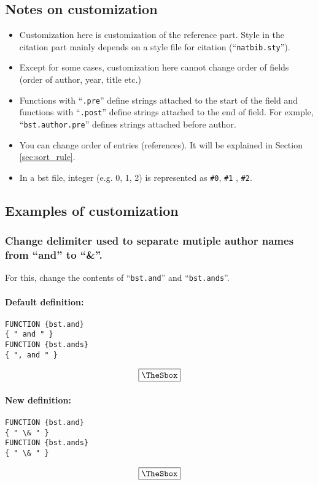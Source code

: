 \documentclass[10pt]{article}
\newenvironment{Frame}%
{\setlength{\fboxsep}{15pt}
\setlength{\mylength}{\linewidth}%
\addtolength{\mylength}{-2\fboxsep}%
\addtolength{\mylength}{-2\fboxrule}%
\Sbox
\minipage{\mylength}%
\setlength{\abovedisplayskip}{0pt}%
\setlength{\belowdisplayskip}{0pt}%
}%
{\endminipage\endSbox
\[\fbox{\TheSbox}\]}
\begin{document}
\subsection{Notes on customization}

\begin{itemize}
 \item Customization here is customization of the reference part.  Style
       in the citation part mainly depends on a style file for citation
       (``\texttt{natbib.sty}'').
 \item Except for some cases, customization here cannot change order
       of fields (order of author, year, title etc.)
 \item Functions with ``\texttt{.pre}'' define strings attached to the start
       of the field and functions with ``\texttt{.post}'' define strings
       attached to the end of field.  For exmple,
       ``\texttt{bst.author.pre}'' defines strings attached before author.
 \item You can change order of entries (references).  It will be
       explained in Section \ref{sec:sort_rule}.
 \item In a bst file, integer (e.g. 0, 1, 2) is represented as \verb|#0|, \verb|#1| , \verb|#2|.
\end{itemize}

\subsection{Examples of customization}

\subsubsection{Change delimiter used to separate mutiple author names
   from ``and'' to ``\&''.}

For this, change the contents of ``\texttt{bst.and}'' and ``\texttt{bst.ands}''.
\paragraph{Default definition:}
\begin{Frame}
\begin{verbatim}
FUNCTION {bst.and}
{ " and " }
FUNCTION {bst.ands}
{ ", and " }
\end{verbatim}
\end{Frame}

\paragraph{New definition:}
\begin{Frame}
\begin{verbatim}
FUNCTION {bst.and}
{ " \& " }
FUNCTION {bst.ands}
{ " \& " }
\end{verbatim}
\end{Frame}
\end{document}
